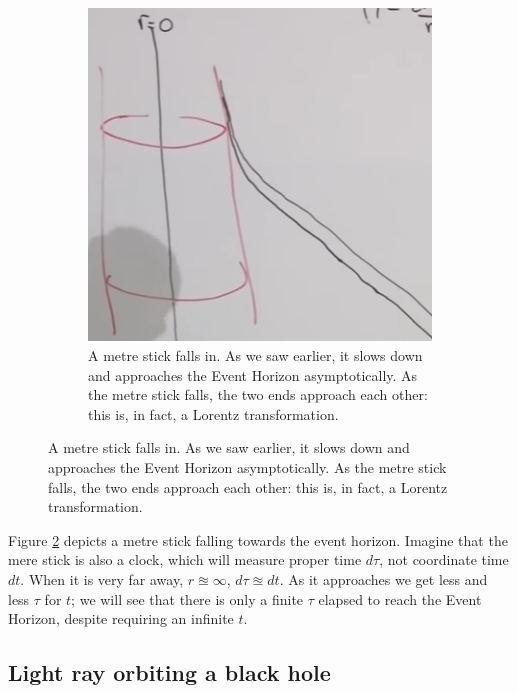 \documentclass[]{article}
\begin{document}
{\begin{figure}[H]
\begin{center}
\begin{subfigure}[t]{0.45\textwidth}
		\end{subfigure}
		\begin{subfigure}[t]{0.45\textwidth}
			\caption{A metre stick falls in. As we saw earlier, it slows down and approaches the Event Horizon asymptotically. As the metre stick falls, the two ends approach each other: this is, in fact, a Lorentz transformation.}\label{fig:gr-6-infalling}
			\includegraphics[width=\textwidth]{gr-6-infalling}
		\end{subfigure}
	\end{center}
\end{figure}

Figure \ref{fig:gr-6-infalling} depicts a metre stick falling towards the event horizon. Imagine that the mere stick is also a clock, which will measure proper time $d\tau$, not coordinate time $dt$. When it is very far away, $r\approxeq\infty$, $d\tau\approxeq dt$. As it approaches we get less and less $\tau$ for $t$; we will see that there is only a finite $\tau$ elapsed to reach the Event Horizon, despite requiring an infinite $t$.




\subsection{Light ray orbiting a black hole}

}
\end{document}

